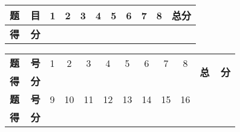 \documentclass[12pt,twoside]{article}
\makeatletter
\renewcommand\[{\relax
               \ifmmode\@badmath
               \else
                 \begin{trivlist}%
                   \@beginparpenalty\predisplaypenalty
                   \@endparpenalty\postdisplaypenalty
                   \item[]\leavevmode
                   \hb@xt@\linewidth\bgroup $\m@th\displaystyle %
                     \hskip\mathindent\bgroup
               \fi}
\renewcommand\]{\relax
               \ifmmode
                     \egroup $\hfil%
                   \egroup
                 \end{trivlist}%
               \else \@badmath
               \fi}
\makeatother
\begin{document}
\begin{CJK}{GBK}{song}
\bigskip

\begin{table}[htbp]\centering
\begin{tabular}{|c|c|c|c|c|c|c|c|c|c|}
\hline
\textbf{题\ \ 目}& 1 & 2 & 3 & 4 & 5 & 6 & 7 & 8 & \textbf{总分}\\
\hline \textbf{得\ \ 分}& \hspace{10mm} & \hspace{10mm} &
\hspace{10mm} &\hspace{10mm}
& \hspace{10mm} & \hspace{10mm} & \hspace{10mm} & \hspace{10mm} & \hspace{10mm} \\
\hline
\end{tabular}
\end{table}

\bigskip

\bigskip

\noindent
\begin{tabular}{|c|c|c|c|c|c|c|c|c|c|}
\hline
\textbf{题\ \ 号}& 1 & 2 & 3 & 4 & 5 & 6 & 7 & 8 & \multirow{2}{10pt}{\textbf{总\ \ 分}}\\
\cline{1-9} \textbf{得\ \ 分}& \hspace{10mm} & \hspace{10mm} &
\hspace{10mm} &\hspace{10mm}
& \hspace{10mm} & \hspace{10mm} & \hspace{10mm} & \hspace{10mm} & \hspace{10mm} \\
\hline
\textbf{题\ \ 号} & 9 & 10 & 11 & 12 & 13 & 14 & 15 & 16 &  \multirow{2}{10pt}{} \\
\cline{1-9} \textbf{得\ \ 分} & \hspace{10mm} & \hspace{10mm} &
\hspace{10mm} &\hspace{10mm}
& \hspace{10mm} & \hspace{10mm} & \hspace{10mm} & \hspace{10mm}& \hspace{10mm}\\
\hline
\end{tabular}


\end{CJK}
\end{document}

